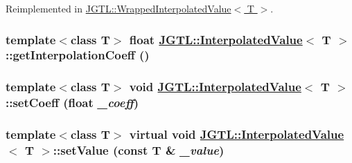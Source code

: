 Reimplemented in \hyperlink{class_j_g_t_l_1_1_wrapped_interpolated_value_0608de450007ab26e20cd9a680da7e84}{JGTL::Wrapped\-Interpolated\-Value$<$ T $>$}.\hypertarget{class_j_g_t_l_1_1_interpolated_value_79acd7ca199cd56a2930dd362f0e78ef}{
\subsubsection[getInterpolationCoeff]{\setlength{\rightskip}{0pt plus 5cm}template$<$class T$>$ float \hyperlink{class_j_g_t_l_1_1_interpolated_value}{JGTL::Interpolated\-Value}$<$ T $>$::get\-Interpolation\-Coeff ()}}
\label{class_j_g_t_l_1_1_interpolated_value_79acd7ca199cd56a2930dd362f0e78ef}


\hypertarget{class_j_g_t_l_1_1_interpolated_value_fbd2118a23563bf541c1388131035ef5}{
\subsubsection[setCoeff]{\setlength{\rightskip}{0pt plus 5cm}template$<$class T$>$ void \hyperlink{class_j_g_t_l_1_1_interpolated_value}{JGTL::Interpolated\-Value}$<$ T $>$::set\-Coeff (float {\em \_\-coeff})}}
\label{class_j_g_t_l_1_1_interpolated_value_fbd2118a23563bf541c1388131035ef5}


\hypertarget{class_j_g_t_l_1_1_interpolated_value_eaeff236b97efbf0c616333e1b94b210}{
\subsubsection[setValue]{\setlength{\rightskip}{0pt plus 5cm}template$<$class T$>$ virtual void \hyperlink{class_j_g_t_l_1_1_interpolated_value}{JGTL::Interpolated\-Value}$<$ T $>$::set\-Value (const T \& {\em \_\-value})}}
\label{class_j_g_t_l_1_1_interpolated_value_eaeff236b97efbf0c616333e1b94b210}




